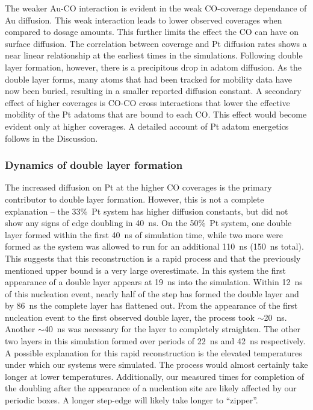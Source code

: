 \documentclass[journal = jpccck, manuscript = article]{achemso}
\begin{document}
The weaker Au-CO interaction is evident in the weak CO-coverage 
dependance of Au diffusion. This weak interaction leads to lower 
observed coverages when compared to dosage amounts. This further 
limits the effect the CO can have on surface diffusion. The correlation 
between coverage and Pt diffusion rates shows a near linear relationship 
at the earliest times in the simulations. Following double layer formation, 
however, there is a precipitous drop in adatom diffusion. As the double 
layer forms, many atoms that had been tracked for mobility data have 
now been buried, resulting in a smaller reported diffusion constant. A
secondary effect of higher coverages is CO-CO cross interactions that
lower the effective mobility of the Pt adatoms that are bound to each CO.
This effect would become evident only at higher coverages. A detailed
account of Pt adatom energetics follows in the Discussion.
 
\subsubsection{Dynamics of double layer formation}
The increased diffusion on Pt at the higher CO coverages is the primary 
contributor to double layer formation. However, this is not a complete 
explanation -- the 33\%~Pt system has higher diffusion constants, but 
did not show any signs of edge doubling in 40~ns. On the 50\%~Pt 
system, one double layer formed within the first 40~ns of simulation time, 
while two more were formed as the system was allowed to run for an 
additional 110~ns (150~ns total). This suggests that this reconstruction 
is a rapid process and that the previously mentioned upper bound is a 
very large overestimate.\cite{Williams:1991,Pearl} In this system the first 
appearance of a double layer appears at 19~ns into the simulation. 
Within 12~ns of this nucleation event, nearly half of the step has formed 
the double layer and by 86~ns the complete layer has flattened out. 
From the appearance of the first nucleation event to the first observed 
double layer, the process took $\sim$20~ns. Another $\sim$40~ns was 
necessary for the layer to completely straighten. The other two layers in 
this simulation formed over periods of 22~ns and 42~ns respectively. 
A possible explanation for this rapid reconstruction is the elevated 
temperatures under which our systems were simulated. The process 
would almost certainly take longer at lower temperatures. Additionally, 
our measured times for completion of the doubling after the appearance 
of a nucleation site are likely affected by our periodic boxes. A longer 
step-edge will likely take longer to ``zipper''. 
\end{document}
